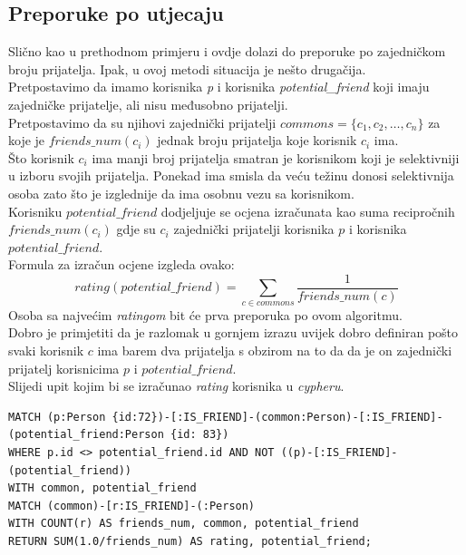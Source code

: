 \documentclass[titlepage, 12pt]{scrartcl}
\begin{document}
\subsection*{Preporuke po utjecaju}
Slično kao u prethodnom primjeru i ovdje dolazi do preporuke po zajedničkom broju prijatelja. Ipak, u ovoj metodi situacija je nešto drugačija. \\
Pretpostavimo da imamo korisnika \emph{p} i korisnika \emph{potential\_friend} koji imaju zajedničke prijatelje, ali nisu međusobno prijatelji. \\
Pretpostavimo da su njihovi zajednički prijatelji $commons = \{c_1, c_2, \dots, c_n\}$ za koje je $friends\_num(c_i)$ jednak broju prijatelja koje korisnik $c_i$ ima. \\
Što korisnik $c_i$ ima manji broj prijatelja smatran je korisnikom koji je selektivniji u izboru svojih prijatelja. Ponekad ima smisla da veću težinu donosi selektivnija osoba zato što je izglednije da ima osobnu vezu sa korisnikom. \\
Korisniku $potential\_friend$ dodjeljuje se ocjena izračunata kao suma recipročnih $friends\_num(c_i)$ gdje su $c_i$ zajednički prijatelji korisnika $p$ i korisnika $potential\_friend$. \\
Formula za izračun ocjene izgleda ovako:
\begin{equation*}
    rating(potential\_friend) = \sum_{c \in commons} \frac{1}{friends\_num(c)}
\end{equation*}
Osoba sa najvećim \emph{ratingom} bit će prva preporuka po ovom algoritmu. \\
Dobro je primjetiti da je razlomak u gornjem izrazu uvijek dobro definiran pošto svaki korisnik $c$ ima barem dva prijatelja s obzirom na to da da je on zajednički prijatelj korisnicima $p$ i $potential\_friend$. \\
Slijedi upit kojim bi se izračunao \emph{rating} korisnika u \emph{cypheru}.

\begin{samepage}
\begin{verbatim}
MATCH (p:Person {id:72})-[:IS_FRIEND]-(common:Person)-[:IS_FRIEND]-
(potential_friend:Person {id: 83}) 
WHERE p.id <> potential_friend.id AND NOT ((p)-[:IS_FRIEND]-(potential_friend)) 
WITH common, potential_friend
MATCH (common)-[r:IS_FRIEND]-(:Person)
WITH COUNT(r) AS friends_num, common, potential_friend
RETURN SUM(1.0/friends_num) AS rating, potential_friend;
\end{verbatim}
\end{samepage}
\end{document}
